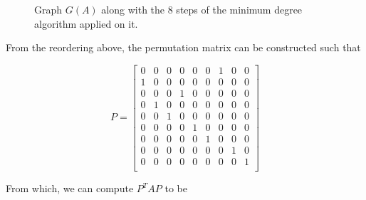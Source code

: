 \begin{figure}[!tbh]
   \caption{Graph $G(A)$ along with the 8 steps of the minimum degree algorithm applied on it. }
   \label{fig:problem_4}
\end{figure}

\noindent
From the reordering above, the permutation matrix can be constructed such that 

$$
P = 
\begin{bmatrix}
0 & 0 & 0 & 0 & 0 & 0 & 1 & 0 & 0\\
1 & 0 & 0 & 0 & 0 & 0 & 0 & 0 & 0\\
0 & 0 & 0 & 1 & 0 & 0 & 0 & 0 & 0\\
0 & 1 & 0 & 0 & 0 & 0 & 0 & 0 & 0\\
0 & 0 & 1 & 0 & 0 & 0 & 0 & 0 & 0\\
0 & 0 & 0 & 0 & 1 & 0 & 0 & 0 & 0\\
0 & 0 & 0 & 0 & 0 & 1 & 0 & 0 & 0\\
0 & 0 & 0 & 0 & 0 & 0 & 0 & 1 & 0\\
0 & 0 & 0 & 0 & 0 & 0 & 0 & 0 & 1\\
\end{bmatrix}
$$

\noindent
From which, we can compute $P^{T}AP$ to be

